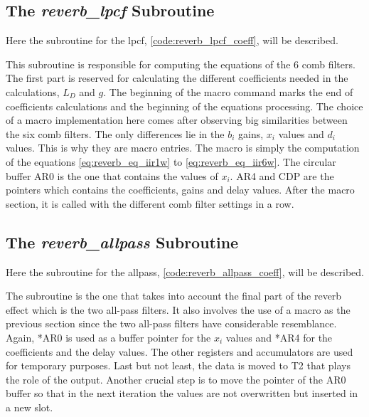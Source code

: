 \subsection{The \textit{reverb_lpcf} Subroutine}
Here the subroutine for the \gls{lpcf}, \autoref{code:reverb_lpcf_coeff}, will be described.


This subroutine is responsible for computing the equations of the 6 comb filters. The first part is reserved for calculating the different coefficients needed in the calculations, $L_D$ and $g$. The beginning of the macro command marks the end of coefficients calculations and the beginning of the equations processing. The choice of a macro implementation here comes after observing big similarities between the six comb filters. The only differences lie in the $b_{i}$ gains, $x_{i}$ values and $d_{i}$ values. This is why they are macro entries. The macro is simply the computation of the equations \ref{eq:reverb_eq_iir1w} to \ref{eq:reverb_eq_iir6w}. The circular buffer AR0 is the one that contains the values of $x_{i}$. AR4 and CDP are the pointers which contains the coefficients, gains and delay values.
After the macro section, it is called with the different comb filter settings in a row. 

\subsection{The \textit{reverb_allpass} Subroutine}
Here the subroutine for the allpass, \autoref{code:reverb_allpass_coeff}, will be described.

The subroutine is the one that takes into account the final part of the \gls{reverb} effect which is the two all-pass filters. It also involves the use of a macro as the previous section since the two all-pass filters have considerable resemblance. Again, *AR0 is used as a buffer pointer for the $x_{i}$ values and *AR4 for the coefficients and the delay values. The other registers and accumulators are used for temporary purposes.
Last but not least, the data is moved to T2 that plays the role of the output. 
Another crucial step is to move the pointer of the AR0 buffer so that in the next iteration the values are not overwritten but inserted in a new slot.
